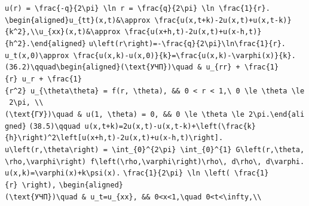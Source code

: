 \documentclass[
  ukrainian,
]{article}
\begin{document}
\texttt{u(r)\ =\ \textbackslash{}frac\{-q\}\{2\textbackslash{}pi\}\ \textbackslash{}ln\ r\ =\ \textbackslash{}frac\{q\}\{2\textbackslash{}pi\}\ \textbackslash{}ln\ \textbackslash{}frac\{1\}\{r\}.}
\texttt{\textbackslash{}begin\{aligned\}u\_\{tt\}(x,t)\&\textbackslash{}approx\ \textbackslash{}frac\{u(x,t+k)-2u(x,t)+u(x,t-k)\}\{k\^{}2\},\textbackslash{}\textbackslash{}u\_\{xx\}(x,t)\&\textbackslash{}approx\ \textbackslash{}frac\{u(x+h,t)-2u(x,t)+u(x-h,t)\}\{h\^{}2\}.\textbackslash{}end\{aligned\}}
\texttt{u\textbackslash{}left(r\textbackslash{}right)=-\textbackslash{}frac\{q\}\{2\textbackslash{}pi\}\textbackslash{}ln\textbackslash{}frac\{1\}\{r\}.}
\texttt{u\_t(x,0)\textbackslash{}approx\ \textbackslash{}frac\{u(x,k)-u(x,0)\}\{k\}=\textbackslash{}frac\{u(x,k)-\textbackslash{}varphi(x)\}\{k\}.}
\texttt{(36.2)\textbackslash{}qquad\textbackslash{}begin\{aligned\}(\textbackslash{}text\{УЧП\})\textbackslash{}quad\ \&\ u\_\{rr\}\ +\ \textbackslash{}frac\{1\}\{r\}\ u\_r\ +\ \textbackslash{}frac\{1\}\{r\^{}2\}\ u\_\{\textbackslash{}theta\textbackslash{}theta\}\ =\ f(r,\ \textbackslash{}theta),\ \&\&\ 0\ \textless{}\ r\ \textless{}\ 1,\textbackslash{}\ 0\ \textbackslash{}le\ \textbackslash{}theta\ \textbackslash{}le\ 2\textbackslash{}pi,\ \textbackslash{}\textbackslash{}(\textbackslash{}text\{ГУ\})\textbackslash{}quad\ \&\ u(1,\ \textbackslash{}theta)\ =\ 0,\ \&\&\ 0\ \textbackslash{}le\ \textbackslash{}theta\ \textbackslash{}le\ 2\textbackslash{}pi.\textbackslash{}end\{aligned\}}
\texttt{(38.5)\textbackslash{}qquad\ u(x,t+k)=2u(x,t)-u(x,t-k)+\textbackslash{}left(\textbackslash{}frac\{k\}\{h\}\textbackslash{}right)\^{}2\textbackslash{}left{[}u(x+h,t)-2u(x,t)+u(x-h,t)\textbackslash{}right{]}.}
\texttt{u\textbackslash{}left(r,\textbackslash{}theta\textbackslash{}right)\ =\ \textbackslash{}int\_\{0\}\^{}\{2\textbackslash{}pi\}\ \textbackslash{}int\_\{0\}\^{}\{1\}\ G\textbackslash{}left(r,\textbackslash{}theta,\textbackslash{}rho,\textbackslash{}varphi\textbackslash{}right)\ f\textbackslash{}left(\textbackslash{}rho,\textbackslash{}varphi\textbackslash{}right)\textbackslash{}rho\textbackslash{},\ d\textbackslash{}rho\textbackslash{},\ d\textbackslash{}varphi.}
\texttt{u(x,k)=\textbackslash{}varphi(x)+k\textbackslash{}psi(x).}
\texttt{\textbackslash{}frac\{1\}\{2\textbackslash{}pi\}\ \textbackslash{}ln\ \textbackslash{}left(\ \textbackslash{}frac\{1\}\{r\}\ \textbackslash{}right),}
\texttt{\textbackslash{}begin\{aligned\}}
\texttt{(\textbackslash{}text\{УЧП\})\textbackslash{}quad\ \&\ u\_t=u\_\{xx\},\ \&\&\ 0\textless{}x\textless{}1,\textbackslash{}quad\ 0\textless{}t\textless{}\textbackslash{}infty,\textbackslash{}\textbackslash{}}
\end{document}
